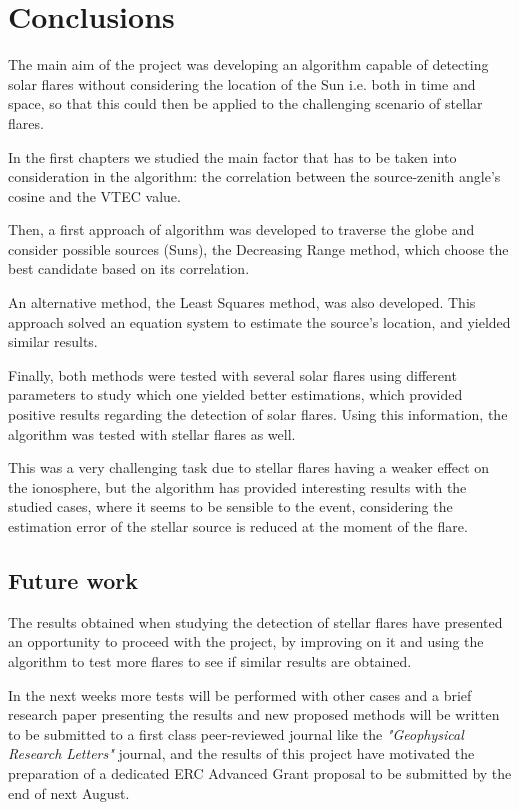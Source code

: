 \chapter{Conclusions}


The main aim of the project was developing an algorithm capable of detecting solar flares without considering the location of the Sun i.e. both in time and space, so that this could then be applied to the challenging scenario of stellar flares.

In the first chapters we studied the main factor that has to be taken into consideration in the algorithm: the correlation between the source-zenith angle's cosine and the VTEC value.

Then, a first approach of algorithm was developed to traverse the globe and consider possible sources (Suns), the Decreasing Range method, which choose the best candidate based on its correlation.

An alternative method, the Least Squares method, was also developed. This approach solved an equation system to estimate the source's location, and yielded similar results.

Finally, both methods were tested with several solar flares using different parameters to study which one yielded better estimations, which provided positive results regarding the detection of solar flares. Using this information, the algorithm was tested with stellar flares as well.

This was a very challenging task due to stellar flares having a weaker effect on the ionosphere, but the algorithm has provided interesting results with the studied cases, where it seems to be sensible to the event, considering the estimation error of the stellar source is reduced at the moment of the flare.
 
\section{Future work}

The results obtained when studying the detection of stellar flares have presented an opportunity to proceed with the project, by improving on it and using the algorithm to test more flares to see if similar results are obtained.

In the next weeks more tests will be performed with other cases and a brief research paper presenting the results and new proposed methods will be written to be submitted to a first class peer-reviewed journal like the \textit{"Geophysical Research Letters"} journal, and the results of this project have motivated the preparation of a dedicated ERC Advanced Grant proposal to be submitted by the end of next August.

